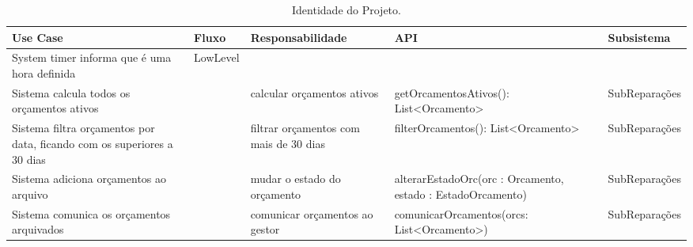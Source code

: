 \documentclass[../relatorio.tex]{subfiles}
\begin{document}
\begin{landscape}
    \begin{table}[!h]
        \centering
        \begin{tabular}{|p{5cm}|p{1cm}|p{4cm}|p{6cm}|p{3cm}|}
            \hline
            \rowcolor{gray!20!white}
            Use Case                                                                & Fluxo    & Responsabilidade                       & API                                                      & Subsistema    \\
            \hline
            \rowcolor{red}
            System timer informa que é uma hora definida                            & LowLevel &                                        &                                                          &               \\
            \hline
            Sistema calcula todos os orçamentos ativos                              &          & calcular orçamentos ativos             & getOrcamentosAtivos(): List<Orcamento>                   & SubReparações \\
            \hline
            Sistema filtra orçamentos por data, ficando com os superiores a 30 dias &          & filtrar orçamentos com mais de 30 dias & filterOrcamentos(): List<Orcamento> & SubReparações \\
            \hline
            Sistema adiciona orçamentos ao arquivo                                  &          & mudar o estado do orçamento    & alterarEstadoOrc(orc : Orcamento, estado : EstadoOrcamento)                        & SubReparações \\
            \hline
            Sistema comunica os orçamentos arquivados                               &          & comunicar orçamentos ao gestor         & comunicarOrcamentos(orcs: List<Orcamento>)               & SubReparações \\
            \hline                      
        \end{tabular}
        \caption{Identidade do Projeto.}
    \end{table}
\end{landscape}
\end{document}
